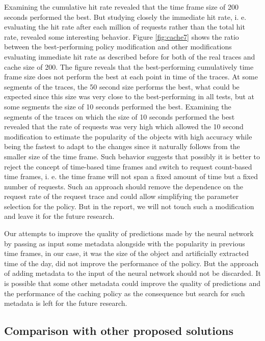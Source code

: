 Examining the cumulative hit rate revealed that the time frame size of 200 seconds performed the best. But studying closely the immediate hit rate, i. e. evaluating the hit rate after each million of requests rather than the total hit rate, revealed some interesting behavior. Figure \ref{fig:cache7} shows the ratio between the best-performing policy modification and other modifications evaluating immediate hit rate as described before for both of the real traces and cache size of 200. The figure reveals that the best-performing cumulatively time frame size does not perform the best at each point in time of the traces. At some segments of the traces, the 50 second size performs the best, what could be expected since this size was very close to the best-performing in all tests, but at some segments the size of 10 seconds performed the best. Examining the segments of the traces on which the size of 10 seconds performed the best revealed that the rate of requests was very high which allowed the 10 second modification to estimate the popularity of the objects with high accuracy while being the fastest to adapt to the changes since it naturally follows from the smaller size of the time frame. Such behavior suggests that possibly it is better to reject the concept of time-based time frames and switch to request count-based time frames, i. e. the time frame will not span a fixed amount of time but a fixed number of requests. Such an approach should remove the dependence on the request rate of the request trace and could allow simplifying the parameter selection for the policy. But in the report, we will not touch such a modification and leave it for the future research.

Our attempts to improve the quality of predictions made by the neural network by passing as input some metadata alongside with the popularity in previous time frames, in our case, it was the size of the object and artificially extracted time of the day, did not improve the performance of the policy. But the approach of adding metadata to the input of the neural network should not be discarded. It is possible that some other metadata could improve the quality of predictions and the performance of the caching policy as the consequence but search for such metadata is left for the future research.

\subsection{Comparison with other proposed solutions}

